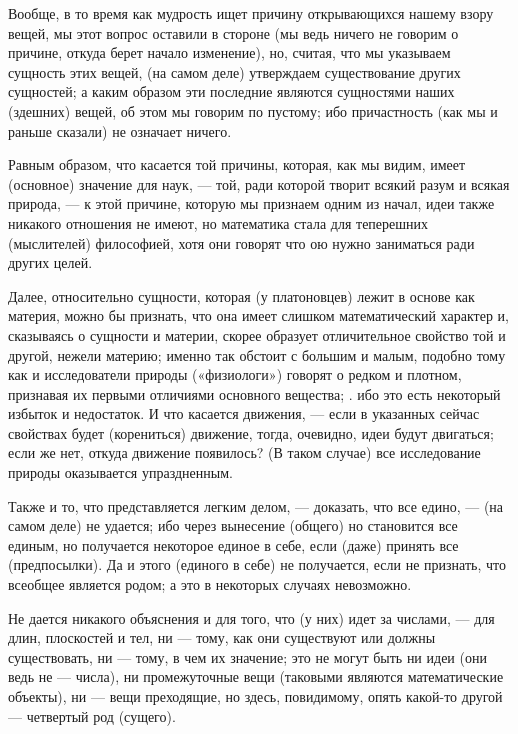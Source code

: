 \documentclass{article}
\begin{document}
Вообще, в то время как мудрость ищет причину открывающихся нашему взору вещей, мы  этот вопрос оставили в стороне (мы ведь ничего не говорим о причине, откуда берет начало изменение), но, считая, что мы указываем сущность этих вещей, (на самом деле) утверждаем существование других сущностей; а каким образом эти последние являются сущностями наших (здешних) вещей, об этом мы говорим по пустому; ибо причастность (как мы и раньше сказали) не означает ничего.

Равным образом, что касается той причины, которая, как мы видим, имеет (основное) значение для наук, --- той, ради которой творит всякий разум и всякая природа, --- к этой причине, которую мы признаем одним из начал, идеи также никакого отношения не имеют, но математика стала для теперешних (мыслителей) философией, хотя они говорят что ою нужно заниматься ради других целей.

Далее, относительно сущности, которая (у платоновцев) лежит в основе как материя, можно бы признать, что она имеет слишком математический характер и, сказываясь о сущности и материи, скорее образует отличительное свойство той и другой, нежели материю; именно так обстоит с большим и малым, подобно тому как и исследователи природы («физиологи») говорят о редком и плотном, признавая их первыми отличиями основного вещества; . ибо это есть некоторый избыток и недостаток.
\footnotemark[34]
И что касается движения, --- если в указанных сейчас свойствах будет (корениться) движение,
\footnotemark[35]
тогда, очевидно, идеи будут двигаться; если же нет, откуда движение появилось? (В таком случае) все исследование природы оказывается упраздненным.
\footnotemark[36]


Также и то, что представляется легким делом, --- доказать, что все едино, --- (на самом деле) не удается; ибо через вынесение (общего) но становится все единым, но получается некоторое единое в себе, если (даже) принять все (предпосылки).
\footnotemark[37]
Да и этого (единого в себе) не получается, если не признать, что всеобщее является родом;
\footnotemark[38]
а это в некоторых случаях невозможно.

Не дается никакого объяснения и для того, что (у них) идет за числами, --- для длин, плоскостей и тел, ни --- тому, как они существуют или должны существовать, ни --- тому, в чем их значение; это не могут быть ни идеи (они ведь не --- числа), ни промежуточные вещи (таковыми являются математические объекты), ни --- вещи преходящие, но здесь, повидимому, опять какой-то другой --- четвертый род (сущего).
\end{document}

